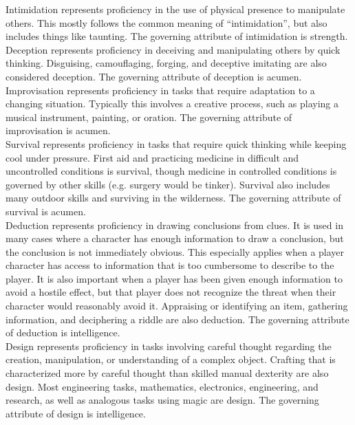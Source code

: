\documentclass[letterpaper,titlepage,openany,twocolumn]{book}
\begin{document}
Intimidation represents proficiency in the use of physical presence to manipulate others. This mostly follows the common meaning of “intimidation”, but also includes things like taunting. The governing attribute of intimidation is strength.\\

Deception represents proficiency in deceiving and manipulating others by quick thinking. Disguising, camouflaging, forging, and deceptive imitating are also considered deception. The governing attribute of deception is acumen.\\

Improvisation represents proficiency in tasks that require adaptation to a changing situation. Typically this involves a creative process, such as playing a musical instrument, painting, or oration. The governing attribute of improvisation is acumen.\\

Survival represents proficiency in tasks that require quick thinking while keeping cool under pressure. First aid and practicing medicine in difficult and uncontrolled conditions is survival, though medicine in controlled conditions is governed by other skills (e.g. surgery would be tinker). Survival also includes many outdoor skills and surviving in the wilderness. The governing attribute of survival is acumen.\\

Deduction represents proficiency in drawing conclusions from clues. It is used in many cases where a character has enough information to draw a conclusion, but the conclusion is not immediately obvious. This especially applies when a player character has access to information that is too cumbersome to describe to the player. It is also important when a player has been given enough information to avoid a hostile effect, but that player does not recognize the threat when their character would reasonably avoid it. Appraising or identifying an item, gathering information, and deciphering a riddle are also deduction. The governing attribute of deduction is intelligence.\\

Design represents proficiency in tasks involving careful thought regarding the creation, manipulation, or understanding of a complex object. Crafting that is characterized more by careful thought than skilled manual dexterity are also design. Most engineering tasks, mathematics, electronics, engineering, and research, as well as analogous tasks using magic are design. The governing attribute of design is intelligence.\\
\end{document}
